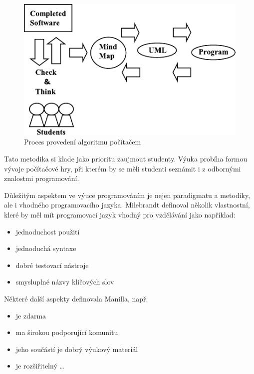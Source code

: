 \documentclass[FP,DP]{tulthesis}
\begin{document}
{{{{{{{\begin{description}
\begin{figure}[ht]
    \centering
    \includegraphics[scale=1.2]{agile.pdf}
\caption{Proces provedení algoritmu počítačem \citep[s.~56]{spirit}} \label{provedeni}
\end{figure}

\item [Game first] Tato metodika si klade jako prioritu zaujmout studenty. Výuka probíha formou vývoje počítačové hry, při kterém by se měli studenti seznámit i z odbornými znalostmi programování.
\end{description}

Důležitým aspektem ve výuce programováním je nejen paradigmatu a metodiky, ale i vhodného programovacího jazyka. Milebrandt definoval několik vlastnostní, kleré by měl mít programovací jazyk vhodný pro vzdělávání jako například:
\vspace{2mm}\begin{itemize}[nosep]
  	\item jednoduchost použití
	\item jednoduchá syntaxe
	\item dobré testovací nástroje
	\item smysluplné názvy klíčových slov
\end{itemize}
\vspace{2mm}Některé další aspekty definovala Manilla, např.
\vspace{2mm}\begin{itemize}[nosep]
  	\item je zdarma
	\item ma širokou podporující komunitu
	\item jeho součástí je dobrý výukový materiál
	\item je rozšiřitelný \ldots
\end{itemize}

}}}}}}}
\end{document}
